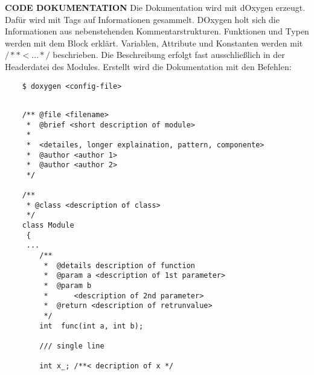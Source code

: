 \documentclass[
   draft=false
  ,paper=a4
  ,twoside=false
  ,fontsize=11pt
  ,headsepline
  ,DIV=11
  ,parskip=full+
  ,titlepage
]{scrartcl} %
\begin{document}
	\begin{minipage}[t]{0.45\linewidth}
	  \large{\textbf{CODE DOKUMENTATION}}\newline
	  \normalsize
	  Die Dokumentation wird mit dOxygen erzeugt. Dafür wird mit Tags 
		auf Informationen gesammelt.
		DOxygen holt sich die Informationen aus 
		nebenstehenden Kommentarstrukturen. Funktionen und Typen werden mit dem
		Block erklärt. Variablen, Attribute und Konstanten werden mit
		$/**< ... */$ beschrieben. Die Beschreibung erfolgt fast ausschließlich 
		in der Headerdatei des Modules.
		Erstellt wird die Dokumentation mit den Befehlen:
		\begin{lstlisting}
    $ doxygen <config-file>
		\end{lstlisting}
		
  \end{minipage}%
  \hfill
  \begin{minipage}[t]{0.5\linewidth}
    \begin{lstlisting}
    
    /** @file <filename>
     *  @brief <short description of module>
     *
     *  <detailes, longer explaination, pattern, componente>
     *  @author <author 1>
     *  @author <author 2>
     */
     
    /**
     * @class <description of class>
     */
    class Module
     { 
     ...
		/** 
		 *  @details description of function
		 *  @param a <description of 1st parameter>
		 *  @param b 
		 *      <description of 2nd parameter>
		 *  @return <description of retrunvalue>
		 */
		int  func(int a, int b);

		/// single line 
		
		int x_; /**< decription of x */
		\end{lstlisting}
  \end{minipage}%
	
\end{document}
